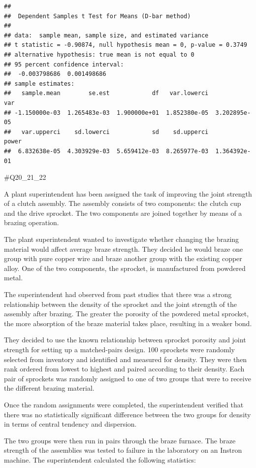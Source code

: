 \documentclass[
]{article}
\begin{document}
\begin{verbatim}
## 
##  Dependent Samples t Test for Means (D-bar method)
## 
## data:  sample mean, sample size, and estimated variance
## t statistic = -0.90874, null hypothesis mean = 0, p-value = 0.3749
## alternative hypothesis: true mean is not equal to 0
## 95 percent confidence interval:
##  -0.003798686  0.001498686
## sample estimates:
##   sample.mean        se.est            df   var.lowerci           var 
## -1.150000e-03  1.265483e-03  1.900000e+01  1.852380e-05  3.202895e-05 
##   var.upperci    sd.lowerci            sd    sd.upperci         power 
##  6.832638e-05  4.303929e-03  5.659412e-03  8.265977e-03  1.364392e-01
\end{verbatim}

\#Q20\_21\_22

A plant superintendent has been assigned the task of improving the joint
strength of a clutch assembly. The assembly consists of two components:
the clutch cup and the drive sprocket. The two components are joined
together by means of a brazing operation.

The plant superintendent wanted to investigate whether changing the
brazing material would affect average braze strength. They decided he
would braze one group with pure copper wire and braze another group with
the existing copper alloy. One of the two components, the sprocket, is
manufactured from powdered metal.

The superintendent had observed from past studies that there was a
strong relationship between the density of the sprocket and the joint
strength of the assembly after brazing. The greater the porosity of the
powdered metal sprocket, the more absorption of the braze material takes
place, resulting in a weaker bond.

They decided to use the known relationship between sprocket porosity and
joint strength for setting up a matched-pairs design. 100 sprockets were
randomly selected from inventory and identified and measured for
density. They were then rank ordered from lowest to highest and paired
according to their density. Each pair of sprockets was randomly assigned
to one of two groups that were to receive the different brazing
material.

Once the random assignments were completed, the superintendent verified
that there was no statistically significant difference between the two
groups for density in terms of central tendency and dispersion.

The two groups were then run in pairs through the braze furnace. The
braze strength of the assemblies was tested to failure in the laboratory
on an Instron machine. The superintendent calculated the following
statistics:
\end{document}
